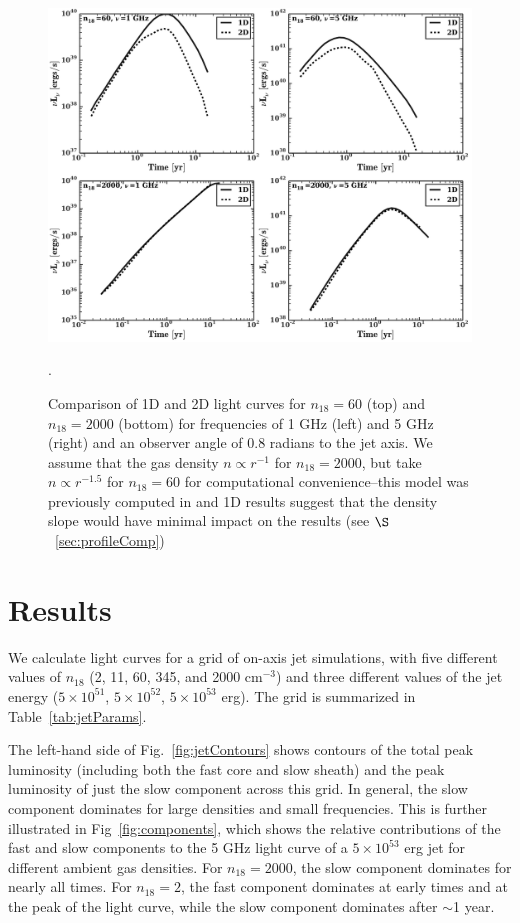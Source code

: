 \documentclass[usenatbib,fleqn]{mnras}
\begin{document}
\begin{figure}
\includegraphics[width=16cm]{1D_2D.pdf}
\caption{\label{fig:1D2DB} Comparison of 1D and 2D light curves for
  $n_{18}=60$ (top) and $n_{18}=2000$ (bottom) for frequencies of 1
  GHz (left) and 5 GHz (right) and an observer angle of 0.8 radians to
  the jet axis. We assume that the gas density $n\propto r^{-1}$ for
  $n_{18}=2000$, but take $n\propto r^{-1.5}$ for $n_{18}=60$ for
  computational convenience--this model was previously computed in
  \citet{Mimica+2015} and 1D results suggest that the density slope
  would have minimal impact on the results (see
  $\S$~\ref{sec:profileComp})}.
\end{figure}

\section{Results}
\label{sec:results}
We calculate light curves for a grid of on-axis jet simulations, with
five different values of $n_{18}$ (2, 11, 60, 345, and 2000 cm$^{-3}$)
and three different values of the jet energy ($5\times 10^{51}$,
$5\times 10^{52}$, $5\times 10^{53}$ erg). The grid is summarized in
Table~\ref{tab:jetParams}.

The left-hand side of Fig.~\ref{fig:jetContours} shows contours of the
total peak luminosity (including both the fast core and slow sheath)
and the peak luminosity of just the slow component across this
grid. In general, the slow component dominates for large densities
and small frequencies.  This is further illustrated in
Fig~\ref{fig:components}, which shows the relative contributions of
the fast and slow components to the 5 GHz light curve of a $5 \times
10^{53}$ erg jet for different ambient gas densities. For
$n_{18}=2000$, the slow component dominates for nearly all times.  For
$n_{18}=2$, the fast component dominates at early times and at the
peak of the light curve, while the slow component dominates after
$\sim$1 year.
\end{document}

